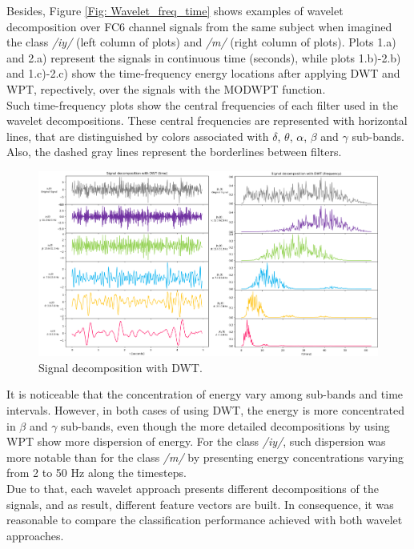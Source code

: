 Besides, Figure \ref{Fig: Wavelet_freq_time} shows examples of wavelet decomposition over FC6 channel signals from the same subject when imagined the class \textit{/iy/} (left column of plots) and \textit{/m/} (right column of plots). Plots 1.a) and 2.a) represent the signals in continuous time (seconds), while plots 1.b)-2.b) and 1.c)-2.c) show the time-frequency energy locations after applying DWT and WPT, repectively, over the signals with the MODWPT function.\\

Such time-frequency plots show the central frequencies of each filter used in the wavelet decompositions. These central frequencies are represented with horizontal lines, that are distinguished by colors associated with $\delta$, $\theta$, $\alpha$, $\beta$ and $\gamma$ sub-bands. Also, the dashed gray lines represent the borderlines between filters.\\

\begin{figure}[h!]
	\includegraphics[width=\linewidth]{Figures/DWT_time_freq.png}
	\centering
	\caption{Signal decomposition with DWT.}
	\label{Fig: DWT_freq_time}
\end{figure}

It is noticeable that the concentration of energy vary among sub-bands and time intervals. However, in both cases of using DWT, the energy is more concentrated in $\beta$ and $\gamma$ sub-bands, even though the more detailed decompositions by using WPT show more dispersion of energy. For the class \textit{/iy/}, such dispersion was more notable than for the class \textit{/m/} by presenting energy concentrations varying from 2 to 50 Hz along the timesteps.\\

Due to that, each wavelet approach presents different decompositions of the signals, and as result, different feature vectors are built. In consequence, it was reasonable to compare the classification performance achieved with both wavelet approaches.\\

